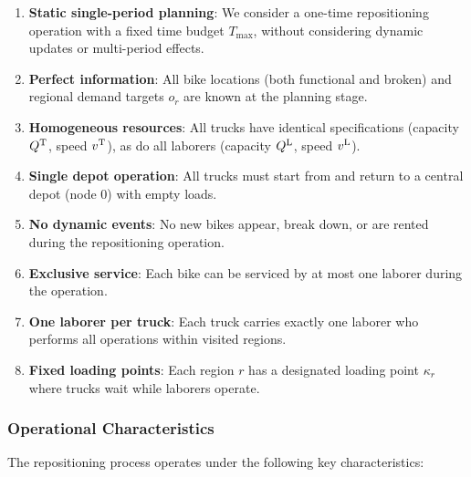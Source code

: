 \begin{enumerate}
    \item \textbf{Static single-period planning}: We consider a one-time repositioning operation with a fixed time budget $T_{\max}$, without considering dynamic updates or multi-period effects.

    \item \textbf{Perfect information}: All bike locations (both functional and broken) and regional demand targets $o_r$ are known at the planning stage.

    \item \textbf{Homogeneous resources}: All trucks have identical specifications (capacity $Q^{\text{T}}$, speed $v^{\text{T}}$), as do all laborers (capacity $Q^{\text{L}}$, speed $v^{\text{L}}$).

    \item \textbf{Single depot operation}: All trucks must start from and return to a central depot (node 0) with empty loads.

    \item \textbf{No dynamic events}: No new bikes appear, break down, or are rented during the repositioning operation.

    \item \textbf{Exclusive service}: Each bike can be serviced by at most one laborer during the operation.

    \item \textbf{One laborer per truck}: Each truck carries exactly one laborer who performs all operations within visited regions.

    \item \textbf{Fixed loading points}: Each region $r$ has a designated loading point $\kappa_r$ where trucks wait while laborers operate.
\end{enumerate}

\subsubsection{Operational Characteristics}

The repositioning process operates under the following key characteristics:

